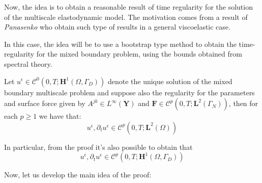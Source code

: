 
Now, the idea is to obtain a reasonable result of time regularity for the solution of the multiscale elastodynamic model. The motivation comes from a result of \textit{Panasenko} who obtain such type of results in a general viscoelastic case.

In this case, the idea will be to use a bootstrap type method to obtain the time-regularity for the mixed boundary problem, using the bounds obtained from spectral theory.

\begin{prop}
\label{BootstrapingProp}
Let $u^{\epsilon} \in \mathcal{C}^{0}(0,T; \mathbf{H}^1(\Omega, \Gamma_D))$ denote the unique solution of the mixed boundary multiscale problem and suppose also the regularity for the parameters and surface force given by $A^{jk} \in L^{\infty}(\mathbf{Y})$ and $\mathbf{F} \in \mathcal{C}^p(0,T; \mathbf{L}^{2}(\Gamma_N))$, then for each $p \geq 1$ we have that:
\begin{equation*}
    u^{\epsilon}, \partial_t u^{\epsilon} \in \mathcal{C}^p(0,T; \mathbf{L}^2(\Omega))
\end{equation*}
\end{prop}
\begin{rem}
In particular, from the proof it's also possible to obtain that
\begin{equation*}
    u^{\epsilon}, \partial_t u^{\epsilon} \in \mathcal{C}^p(0,T; \mathbf{H}^1(\Omega, \Gamma_D))
\end{equation*}
\end{rem}
Now, let us develop the main idea of the proof:\\
